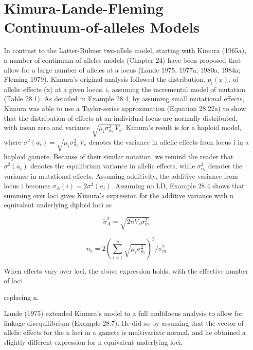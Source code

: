 \documentclass{article}
\begin{document}
\section{Kimura-Lande-Fleming Continuum-of-alleles Models}
In contrast to the Latter-Bulmer two-allele model, starting with Kimura (1965a), a number of continuum-of-alleles models (Chapter 24) have been proposed that allow for a large number of alleles at a locus (Lande 1975, 1977a, 1980a, 1984a; Fleming 1979). Kimura's original analysis followed the distribution,  $ p_i(x) $, of allelic effects (x) at a given locus, i, assuming the incremental model of mutation (Table 28.1). As detailed in Example 28.4, by assuming small mutational effects, Kimura was able to use a Taylor-series approximation (Equation 28.22a) to show that the distribution of effects at an individual locus are normally distributed, with mean zero and variance  $ \sqrt{\mu_i \sigma_{\alpha_i}^2 \, V_s} $. Kimura's result is for a haploid model, where  $ \sigma^2(a_i) = \sqrt{\mu_i \sigma_{\alpha_i}^2 \, V_s} $ denotes the variance in allelic effects from locus i in a haploid gamete. Because of their similar notation, we remind the reader that  $ \sigma^2(a_i) $ denotes the equilibrium variance in allelic effects, while  $ \sigma_{\alpha_i}^2 $ denotes the variance in mutational effects. Assuming additivity, the additive variance from locus i becomes  $ \sigma_A(i) = 2\sigma^2(a_i) $. Assuming no LD, Example 28.4 shows that summing over loci gives Kimura's expression for the additive variance with n equivalent underlying diploid loci as

\begin{equation}
\widetilde{\sigma}_{A}^{2}=\sqrt{2n V_{s}\sigma_{m}^{2}}
\tag{28.14a}
\label{eq:28_14a}
\end{equation}

\begin{equation}
n_{e}=2\left(\sum_{i=1}^{n}\sqrt{\mu_{i}\sigma_{\alpha_{i}}^{2}}\right)^{2}\bigg/\sigma_{m}^{2}
\tag{28.14b}
\label{eq:28_14b}
\end{equation}

When effects vary over loci, the above expression holds, with the effective number of loci

replacing n.

Lande (1975) extended Kimura’s model to a full multilocus analysis to allow for linkage disequilibrium (Example 28.7). He did so by assuming that the vector of allelic effects for the n loci in a gamete is multivariate normal, and he obtained a slightly different expression for n equivalent underlying loci,
\end{document}
